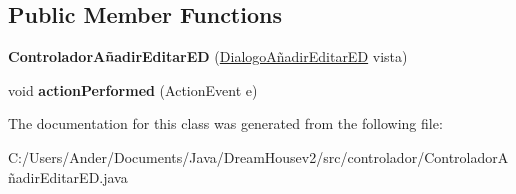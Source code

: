 \subsection*{Public Member Functions}
\begin{DoxyCompactItemize}
\item 
\mbox{\label{classcontrolador_1_1_controlador_a_xC3_xB1adir_editar_e_d_a0fa609c99f3c114987c35f821135d300}} 
{\bfseries Controlador\+Añadir\+Editar\+ED} (\mbox{\hyperlink{classvista_1_1_dialogo_a_xC3_xB1adir_editar_e_d}{Dialogo\+Añadir\+Editar\+ED}} vista)
\item 
\mbox{\label{classcontrolador_1_1_controlador_a_xC3_xB1adir_editar_e_d_a3fd00d9c11231733a48c13b71fd304a6}} 
void {\bfseries action\+Performed} (Action\+Event e)
\end{DoxyCompactItemize}


The documentation for this class was generated from the following file\+:\begin{DoxyCompactItemize}
\item 
C\+:/\+Users/\+Ander/\+Documents/\+Java/\+Dream\+Housev2/src/controlador/Controlador\+Añadir\+Editar\+E\+D.\+java\end{DoxyCompactItemize}
